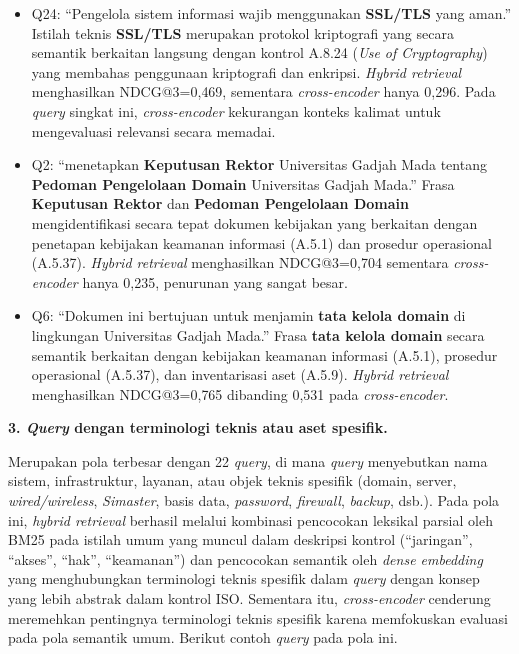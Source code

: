 \begin{itemize}
	\item Q24: ``Pengelola sistem informasi wajib menggunakan \textbf{SSL/TLS} yang aman.'' Istilah teknis \textbf{SSL/TLS} merupakan protokol kriptografi yang secara semantik berkaitan langsung dengan kontrol A.8.24 (\textit{Use of Cryptography}) yang membahas penggunaan kriptografi dan enkripsi. \textit{Hybrid retrieval} menghasilkan NDCG@3=0{,}469, sementara \textit{cross-encoder} hanya 0{,}296. Pada \textit{query} singkat ini, \textit{cross-encoder} kekurangan konteks kalimat untuk mengevaluasi relevansi secara memadai.
	\item Q2: ``menetapkan \textbf{Keputusan Rektor} Universitas Gadjah Mada tentang \textbf{Pedoman Pengelolaan Domain} Universitas Gadjah Mada.'' Frasa \textbf{Keputusan Rektor} dan \textbf{Pedoman Pengelolaan Domain} mengidentifikasi secara tepat dokumen kebijakan yang berkaitan dengan penetapan kebijakan keamanan informasi (A.5.1) dan prosedur operasional (A.5.37). \textit{Hybrid retrieval} menghasilkan NDCG@3=0{,}704 sementara \textit{cross-encoder} hanya 0{,}235, penurunan yang sangat besar.
	\item Q6: ``Dokumen ini bertujuan untuk menjamin \textbf{tata kelola domain} di lingkungan Universitas Gadjah Mada.'' Frasa \textbf{tata kelola domain} secara semantik berkaitan dengan kebijakan keamanan informasi (A.5.1), prosedur operasional (A.5.37), dan inventarisasi aset (A.5.9). \textit{Hybrid retrieval} menghasilkan NDCG@3=0{,}765 dibanding 0{,}531 pada \textit{cross-encoder}.
\end{itemize}

\textbf{3. \textit{Query} dengan terminologi teknis atau aset spesifik.}

Merupakan pola terbesar dengan 22 \textit{query}, di mana \textit{query} menyebutkan nama sistem, infrastruktur, layanan, atau objek teknis spesifik (domain, server, \textit{wired/wireless}, \textit{Simaster}, basis data, \textit{password}, \textit{firewall}, \textit{backup}, dsb.). Pada pola ini, \textit{hybrid retrieval} berhasil melalui kombinasi pencocokan leksikal parsial oleh BM25 pada istilah umum yang muncul dalam deskripsi kontrol (``jaringan'', ``akses'', ``hak'', ``keamanan'') dan pencocokan semantik oleh \textit{dense embedding} yang menghubungkan terminologi teknis spesifik dalam \textit{query} dengan konsep yang lebih abstrak dalam kontrol ISO. Sementara itu, \textit{cross-encoder} cenderung meremehkan pentingnya terminologi teknis spesifik karena memfokuskan evaluasi pada pola semantik umum. Berikut contoh \textit{query} pada pola ini.


